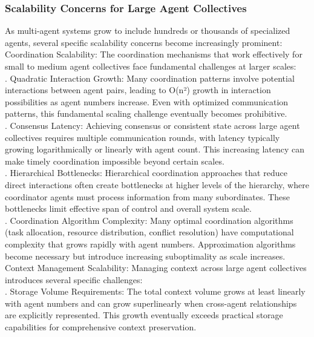 \subsubsection{Scalability Concerns for Large Agent Collectives}
As multi-agent systems grow to include hundreds or thousands of specialized agents, several specific scalability concerns become increasingly prominent:\\ \newline
Coordination Scalability: The coordination mechanisms that work effectively for small to medium agent collectives face fundamental challenges at larger scales:\\ . Quadratic Interaction Growth: Many coordination patterns involve potential interactions between agent pairs, leading to O(n²) growth in interaction possibilities as agent numbers increase. Even with optimized communication patterns, this fundamental scaling challenge eventually becomes prohibitive.\\ . Consensus Latency: Achieving consensus or consistent state across large agent collectives requires multiple communication rounds, with latency typically growing logarithmically or linearly with agent count. This increasing latency can make timely coordination impossible beyond certain scales.\\ . Hierarchical Bottlenecks: Hierarchical coordination approaches that reduce direct interactions often create bottlenecks at higher levels of the hierarchy, where coordinator agents must process information from many subordinates. These bottlenecks limit effective span of control and overall system scale.\\ . Coordination Algorithm Complexity: Many optimal coordination algorithms (task allocation, resource distribution, conflict resolution) have computational complexity that grows rapidly with agent numbers. Approximation algorithms become necessary but introduce increasing suboptimality as scale increases.\\ \newline
Context Management Scalability: Managing context across large agent collectives introduces several specific challenges:\\ . Storage Volume Requirements: The total context volume grows at least linearly with agent numbers and can grow superlinearly when cross-agent relationships are explicitly represented. This growth eventually exceeds practical storage capabilities for comprehensive context preservation.\\ \newline
